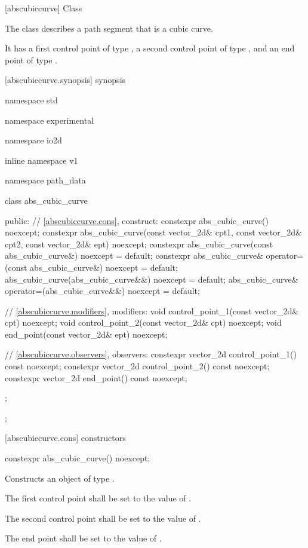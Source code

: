  [abscubiccurve] {Class }

\pnum
{}
The class  describes a path segment that is a cubic \bezierlocal curve.

\pnum
It has a first control point of type , a second control point of type , and an end point of type .

 [abscubiccurve.synopsis] { synopsis}

\begin{codeblock}
namespace std { namespace experimental { namespace io2d { inline namespace v1 {
  namespace path_data {
    class abs_cubic_curve {
    public:
      // \ref{abscubiccurve.cons}, construct:
      constexpr abs_cubic_curve() noexcept;
      constexpr abs_cubic_curve(const vector_2d& cpt1, const vector_2d& cpt2,
        const vector_2d& ept) noexcept;
      constexpr abs_cubic_curve(const abs_cubic_curve&) noexcept = default;
      constexpr abs_cubic_curve& operator=(const abs_cubic_curve&)
        noexcept = default;
      abs_cubic_curve(abs_cubic_curve&&) noexcept = default;
      abs_cubic_curve& operator=(abs_cubic_curve&&)
        noexcept = default;

      // \ref{abscubiccurve.modifiers}, modifiers:
      void control_point_1(const vector_2d& cpt) noexcept;
      void control_point_2(const vector_2d& cpt) noexcept;
      void end_point(const vector_2d& ept) noexcept;


      // \ref{abscubiccurve.observers}, observers:
      constexpr vector_2d control_point_1() const noexcept;
      constexpr vector_2d control_point_2() const noexcept;
      constexpr vector_2d end_point() const noexcept;
    };
  };
} } } }
\end{codeblock}

 [abscubiccurve.cons] { constructors}

\begin{itemdecl}
constexpr abs_cubic_curve() noexcept;
\end{itemdecl}
\begin{itemdescr}
\pnum
\effects
Constructs an object of type .

\pnum
The first control point shall be set to the value of .

\pnum
The second control point shall be set to the value of .

\pnum
The end point shall be set to the value of .
\end{itemdescr}

